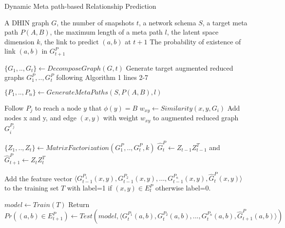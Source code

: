 \begin{algorithm}[t]
\caption{Dynamic Meta path-based Relationship Prediction}\label{alg2}
\begin{algorithmic}[1]\scriptsize
\REQUIRE A DHIN graph $G$, the number of snapshots $t$, a network schema $S$, a target meta path $P(A,B)$, the maximum length of a meta path $l$, the latent space dimension $k$, the link to predict $(a,b)$ at $t+1$
\ENSURE The probability of existence of link $(a,b)$ in $G^P_{t+1}$

\STATE $\{G_1, .., G_t\} \leftarrow DecomposeGraph(G, t)$
\STATE  Generate target augmented reduced graphs $G^P_1, .., G^P_t$ following Algorithm 1 lines 2-7

\STATE $\{P_1, .., P_n\} \leftarrow GenerateMetaPaths(S, P(A,B), l)$



        \STATE Follow $P_j$ to reach a node $y$ that $\phi(y)=B$%
        \STATE $w_{xy} \leftarrow Similarity(x,y, G_i)$
        \STATE Add nodes x and y, and edge $(x,y)$ with weight $w_{xy}$ to augmented reduced graph $G_i^{P_j}$ 
\ENDFOR

\ENDFOR


\ENDFOR

\STATE $\{Z_1, .., Z_t\} \leftarrow MatrixFactorization(G^{P}_1, .., G^{P}_t, k)$
\STATE $\hat{G}^{P}_{t} \leftarrow Z_{t-1}Z^T_{t-1}$ and  $\hat{G}^{P}_{t+1} \leftarrow Z_tZ^T_t$



\STATE Add the feature vector $\langle G^{P_1}_{t-1}(x,y), G^{P_2}_{t-1}(x,y), ..., G^{P_n}_{t-1}(x,y), \hat{G}^{P}_{t}(x,y)\rangle$ to the training set $T$ with label=1 if $(x,y) \in E^{P}_{t}$ otherwise label=0.

\ENDFOR



\STATE $model \leftarrow Train(T)$
\STATE Return $Pr((a,b)\in E^P_{t+1}) \leftarrow Test(model, \langle G^{P_1}_{t}(a,b), G^{P_2}_{t}(a,b), ..., G^{P_n}_{t}(a,b), \hat{G}^{P}_{t+1}(a,b)\rangle)$

\end{algorithmic}
\end{algorithm}

